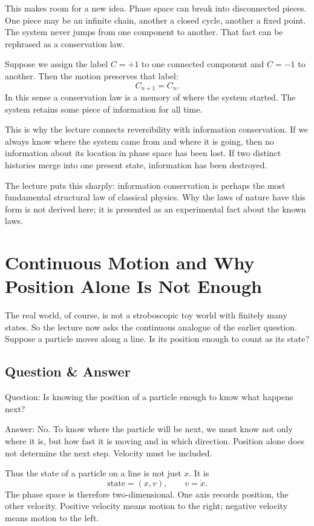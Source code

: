 This makes room for a new idea. Phase space can break into disconnected pieces. One piece may be an infinite chain, another a closed cycle, another a fixed point. The system never jumps from one component to another. That fact can be rephrased as a conservation law.

Suppose we assign the label \(C=+1\) to one connected component and \(C=-1\) to another. Then the motion preserves that label:
\begin{equation}
C_{n+1}=C_n.
\end{equation}
In this sense a conservation law is a memory of where the system started. The system retains some piece of information for all time.

This is why the lecture connects reversibility with information conservation. If we always know where the system came from and where it is going, then no information about its location in phase space has been lost. If two distinct histories merge into one present state, information has been destroyed.

The lecture puts this sharply: information conservation is perhaps the most fundamental structural law of classical physics. Why the laws of nature have this form is not derived here; it is presented as an experimental fact about the known laws.

\section{Continuous Motion and Why Position Alone Is Not Enough}

The real world, of course, is not a stroboscopic toy world with finitely many states. So the lecture now asks the continuous analogue of the earlier question. Suppose a particle moves along a line. Is its position enough to count as its state?

\subsection{Question \& Answer}

Question: Is knowing the position of a particle enough to know what happens next?

Answer: No. To know where the particle will be next, we must know not only where it is, but how fast it is moving and in which direction. Position alone does not determine the next step. Velocity must be included.

Thus the state of a particle on a line is not just \(x\). It is
\begin{equation}
\text{state}=(x,v),\qquad v=\dot{x}.
\end{equation}
The phase space is therefore two-dimensional. One axis records position, the other velocity. Positive velocity means motion to the right; negative velocity means motion to the left.

